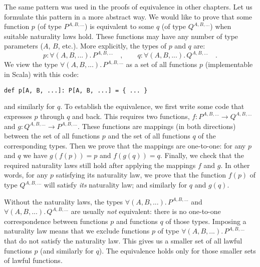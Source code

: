 The same pattern was used in the proofs of equivalence in other chapters.
Let us formulate this pattern in a more abstract way. We would like
to prove that some function $p$ (of type $P^{A,B,...}$) is equivalent
to some $q$ (of type $Q^{A,B,...}$) when suitable naturality laws
hold. These functions may have any number of type parameters ($A$,
$B$, etc.). More explicitly, the types of $p$ and $q$ are:
\[
p:\forall(A,B,...).\,P^{A,B,...}\quad,\quad\quad q:\forall(A,B,...).\,Q^{A,B,...}\quad.
\]
We view the type $\forall(A,B,...).\,P^{A,B,...}$ as a set of all
functions $p$ (implementable in Scala) with this code:
\begin{lstlisting}
def p[A, B, ...]: P[A, B, ...] = { ... }
\end{lstlisting}
and similarly for $q$. To establish the equivalence, we first write
some code that expresses $p$ through $q$ and back. This requires
two functions, $f:P^{A,B,...}\rightarrow Q^{A,B,...}$ and $g:Q^{A,B,...}\rightarrow P^{A,B,...}$.
These functions are mappings (in both directions) between the set
of all functions $p$ and the set of all functions $q$ of the corresponding
types. Then we prove that the mappings are one-to-one: for any $p$
and $q$ we have $g(f(p))=p$ and $f(g(q))=q$. Finally, we check
that the required naturality laws still hold after applying the mappings
$f$ and $g$. In other words, for any $p$ satisfying its naturality
law, we prove that the function $f(p)$ of type $Q^{A,B,...}$ will
satisfy \emph{its} naturality law; and similarly for $q$ and $g(q)$.

Without the naturality laws, the types $\forall(A,B,...).\,P^{A,B,...}$
and $\forall(A,B,...).\,Q^{A,B,...}$ are usually \emph{not} equivalent:
there is no one-to-one correspondence between functions $p$ and functions
$q$ of those types. Imposing a naturality law means that we exclude
functions $p$ of type $\forall(A,B,...).\,P^{A,B,...}$ that do not
satisfy the naturality law. This gives us a smaller set of all lawful
functions $p$ (and similarly for $q$). The equivalence holds only
for those smaller sets of lawful functions.

